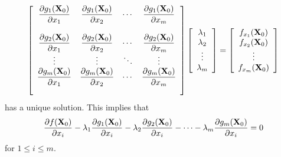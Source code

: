 \documentclass{article}
\newcommand{\dst}{\displaystyle}
\begin{document}
\begin{equation} \label{eq:33}
\left[\begin{array}{ccccccc}
\dst{\frac{\partial{g_{1}({\bf X}_{0})}}{\partial{x_{1}}}}&
\dst{\frac{\partial{g_{1}({\bf X}_{0})}}{\partial{x_{2}}}}&
\cdots&
\dst{\frac{\partial{g_{1}({\bf X}_{0})}}{\partial{x_{m}}}}\\ \\
\dst{\frac{\partial{g_{2}({\bf X}_{0})}}{\partial{x_{1}}}}&
\dst{\frac{\partial{g_{2}({\bf X}_{0})}}{\partial{x_{2}}}}&
\cdots&
\dst{\frac{\partial{g_{2}({\bf X}_{0})}}{\partial{x_{m}}}}\\
\vdots&\vdots&\ddots&\vdots\\
\dst{\frac{\partial{g_{m}({\bf X}_{0})}}{\partial{x_{1}}}}&
\dst{\frac{\partial{g_{m}({\bf X}_{0})}}{\partial{x_{2}}}}&
\cdots&
\dst{\frac{\partial{g_{m}({\bf X}_{0})}}{\partial{x_{m}}}}\\ \\
\end{array}\right]
\left[\begin{array}{ccccccc}
\lambda_{1}\\\lambda_{2}\\ \vdots\\\lambda_{m}
\end{array}\right]=
\left[\begin{array}{ccccccc}
f_{x_{1}}({\bf X}_{0})\\f_{x_{2}}({\bf X}_{0})\\\vdots\\ f_{x_{m}}({\bf
X}_{0})
\end{array}\right]
\end{equation}
has a unique solution.
This implies that
\begin{equation} \label{eq:34}
\frac{\partial{f({\bf X}_{0})}}{\partial x_{i}}
-\lambda_{1}\frac{\partial{g_{1}({\bf X}_{0})}}{\partial x_{i}}
-\lambda_{2}\frac{\partial{g_{2}({\bf X}_{0})}}{\partial x_{i}}-\cdots
-\lambda_{m}\frac{\partial{g_{m}({\bf X}_{0})}}{\partial x_{i}}=0
\end{equation}
for  $1\le i\le m$.
\end{document}
